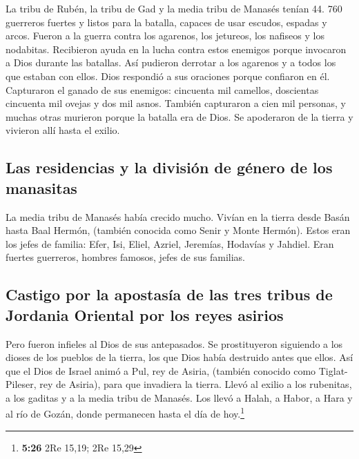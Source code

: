 La tribu de Rubén, la tribu de Gad y la media tribu de
Manasés tenían 44. 760 guerreros fuertes y listos para la batalla,
capaces de usar escudos, espadas y arcos.  Fueron a la
guerra contra los agarenos, los jetureos, los nafiseos y los nodabitas.
 Recibieron ayuda en la lucha contra estos enemigos
porque invocaron a Dios durante las batallas. Así pudieron derrotar a
los agarenos y a todos los que estaban con ellos. Dios respondió a sus
oraciones porque confiaron en él.  Capturaron el ganado
de sus enemigos: cincuenta mil camellos, doscientas cincuenta mil ovejas
y dos mil asnos. También capturaron a cien mil personas, 
y muchas otras murieron porque la batalla era de Dios. Se apoderaron de
la tierra y vivieron allí hasta el exilio.

\hypertarget{las-residencias-y-la-divisiuxf3n-de-guxe9nero-de-los-manasitas}{%
\subsection{Las residencias y la división de género de los
manasitas}\label{las-residencias-y-la-divisiuxf3n-de-guxe9nero-de-los-manasitas}}

 La media tribu de Manasés había crecido mucho. Vivían en
la tierra desde Basán hasta Baal Hermón, (también conocida como Senir y
Monte Hermón).  Estos eran los jefes de familia: Efer,
Isi, Eliel, Azriel, Jeremías, Hodavías y Jahdiel. Eran fuertes
guerreros, hombres famosos, jefes de sus familias.

\hypertarget{castigo-por-la-apostasuxeda-de-las-tres-tribus-de-jordania-oriental-por-los-reyes-asirios}{%
\subsection{Castigo por la apostasía de las tres tribus de Jordania
Oriental por los reyes
asirios}\label{castigo-por-la-apostasuxeda-de-las-tres-tribus-de-jordania-oriental-por-los-reyes-asirios}}

 Pero fueron infieles al Dios de sus antepasados. Se
prostituyeron siguiendo a los dioses de los pueblos de la tierra, los
que Dios había destruido antes que ellos.  Así que el
Dios de Israel animó a Pul, rey de Asiria, (también conocido como
Tiglat-Pileser, rey de Asiria), para que invadiera la tierra. Llevó al
exilio a los rubenitas, a los gaditas y a la media tribu de Manasés. Los
llevó a Halah, a Habor, a Hara y al río de Gozán, donde permanecen hasta
el día de hoy.\footnote{\textbf{5:26} 2Re 15,19; 2Re 15,29}

